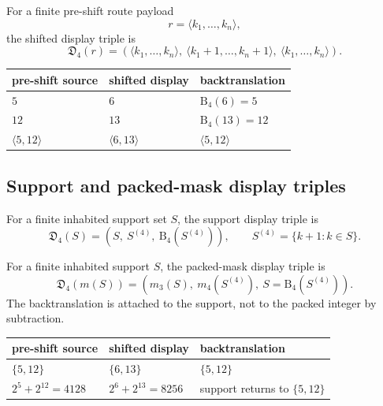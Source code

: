 \begin{definition}
\label{def:v400-r03-route-display-triple}
For a finite pre-shift route payload
\[
 r=\langle k_1,\ldots,k_n\rangle,
\]
the shifted display triple is
\[
 \mathfrak D_4(r)
 =
 \left(
 \langle k_1,\ldots,k_n\rangle,\ 
 \langle k_1+1,\ldots,k_n+1\rangle,\ 
 \langle k_1,\ldots,k_n\rangle
 \right).
\]
\end{definition}

\begin{center}
\small
\begin{tabular}{@{}lll@{}}
\toprule
pre-shift source & shifted display & backtranslation\\
\midrule
$5$ & $6$ & $\mathrm B_4(6)=5$\\
$12$ & $13$ & $\mathrm B_4(13)=12$\\
$\langle 5,12\rangle$ & $\langle 6,13\rangle$ & $\langle 5,12\rangle$\\
\bottomrule
\end{tabular}
\end{center}

\subsection{Support and packed-mask display triples}
\label{subsec:v400-r03-support-packed-mask-display-triples}

\begin{definition}
\label{def:v400-r03-support-display-triple}
For a finite inhabited support set $S$, the support display triple is
\[
 \mathfrak D_4(S)
 =
 (S,\ S^{(4)},\ \mathrm B_4(S^{(4)})),
 \qquad
 S^{(4)}=\{k+1:k\in S\}.
\]
\end{definition}

\begin{definition}
\label{def:v400-r03-packed-mask-display-triple}
For a finite inhabited support $S$, the packed-mask display triple is
\[
 \mathfrak D_4(m(S))
 =
 \left(
 m_3(S),\
 m_4(S^{(4)}),\
 S=\mathrm B_4(S^{(4)})
 \right).
\]
The backtranslation is attached to the support, not to the packed integer by
subtraction.
\end{definition}

\begin{center}
\small
\begin{tabular}{@{}lll@{}}
\toprule
pre-shift source & shifted display & backtranslation\\
\midrule
$\{5,12\}$ & $\{6,13\}$ & $\{5,12\}$\\
$2^5+2^{12}=4128$ & $2^6+2^{13}=8256$ & support returns to $\{5,12\}$\\
\bottomrule
\end{tabular}
\end{center}

